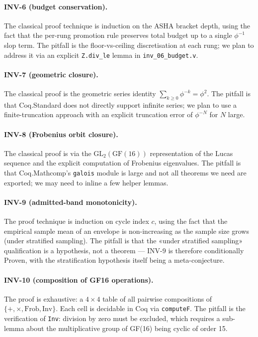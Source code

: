 \paragraph{INV-6 (budget conservation).} The classical proof technique is induction on the ASHA bracket depth, using the fact that the per-rung promotion rule preserves total budget up to a single $\phi^{-1}$ slop term. The pitfall is the floor-vs-ceiling discretisation at each rung; we plan to address it via an explicit \texttt{Z.div\_le} lemma in \texttt{inv\_06\_budget.v}.

\paragraph{INV-7 (geometric closure).} The classical proof is the geometric series identity $\sum_{k \geq 0} \phi^{-k} = \phi^{2}$. The pitfall is that Coq.Standard does not directly support infinite series; we plan to use a finite-truncation approach with an explicit truncation error of $\phi^{-N}$ for $N$ large.

\paragraph{INV-8 (Frobenius orbit closure).} The classical proof is via the $\mathrm{GL}_{2}(\mathrm{GF}(16))$ representation of the Lucas sequence and the explicit computation of Frobenius eigenvalues. The pitfall is that Coq.Mathcomp's \texttt{galois} module is large and not all theorems we need are exported; we may need to inline a few helper lemmas.

\paragraph{INV-9 (admitted-band monotonicity).} The proof technique is induction on cycle index $c$, using the fact that the empirical sample mean of an envelope is non-increasing as the sample size grows (under stratified sampling). The pitfall is that the «under stratified sampling» qualification is a hypothesis, not a theorem — INV-9 is therefore conditionally Proven, with the stratification hypothesis itself being a meta-conjecture.

\paragraph{INV-10 (composition of GF16 operations).} The proof is exhaustive: a $4 \times 4$ table of all pairwise compositions of $\{+, \times, \mathrm{Frob}, \mathrm{Inv}\}$. Each cell is decidable in Coq via \texttt{computeF}. The pitfall is the verification of \texttt{Inv}: division by zero must be excluded, which requires a sub-lemma about the multiplicative group of GF(16) being cyclic of order 15.

